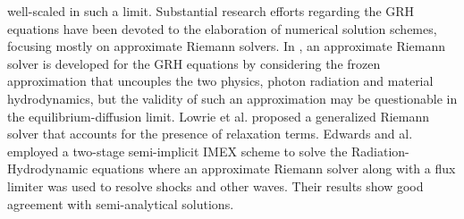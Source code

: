 \documentclass[times]{fldauth}
\begin{document}
well-scaled in such a limit.
%
Substantial research efforts regarding the GRH equations have been devoted to the elaboration of 
numerical solution schemes, focusing mostly on approximate Riemann solvers. In \cite{Balsara}, an 
approximate Riemann solver is developed for the GRH equations by considering the frozen approximation that 
uncouples the two physics, photon radiation and material hydrodynamics, but the validity of such an 
approximation may be questionable in the equilibrium-diffusion limit. Lowrie et al. \cite{LowrieMorelHittinger} 
proposed a generalized Riemann solver that accounts for the presence of relaxation terms. Edwards and al. 
\cite{EdwardsMorelLowrie} employed a two-stage semi-implicit IMEX scheme to solve the Radiation-Hydrodynamic 
equations where an approximate Riemann solver along with a flux limiter was used to resolve shocks and other waves. 
Their results show good agreement with semi-analytical solutions.  
\end{document}
